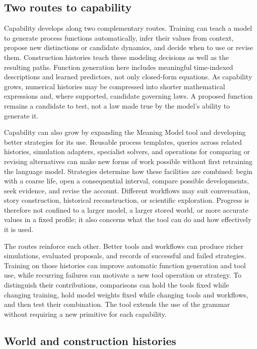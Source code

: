 \documentclass[10pt]{article}
\begin{document}
\subsection{Two routes to capability}

Capability develops along two complementary routes. Training can teach a
model to generate process functions automatically, infer their values from
context, propose new distinctions or candidate dynamics, and decide when to
use or revise them. Construction histories teach these modeling decisions as
well as the resulting paths. Function generation here includes meaningful
time-indexed descriptions and learned predictors, not only closed-form
equations. As capability grows, numerical histories may be compressed into
shorter mathematical expressions and, where supported, candidate governing
laws. A proposed function remains a candidate to test, not a law made
true by the model's ability to generate it.

Capability can also grow by expanding the Meaning Model tool and developing
better strategies for its use. Reusable process templates, queries across
related histories, simulation adapters, specialist solvers, and operations
for comparing or revising alternatives can make new forms of work possible
without first retraining the language model. Strategies determine how these
facilities are combined: begin with a coarse life, open a consequential
interval, compare possible developments, seek evidence, and revise the account.
Different workflows may suit conversation, story construction, historical
reconstruction, or scientific exploration. Progress is therefore not confined
to a larger model, a larger stored world, or more accurate values in a fixed
profile; it also concerns what the tool can do and how effectively it is used.

The routes reinforce each other. Better tools and workflows can produce
richer simulations, evaluated proposals, and records of successful and failed
strategies. Training on those histories can improve automatic function
generation and tool use, while recurring failures can motivate a new tool
operation or strategy. To distinguish their contributions, comparisons can
hold the tools fixed while changing training, hold model weights fixed while
changing tools and workflows, and then test their combination. The tool
extends the use of the grammar without requiring a new primitive for each
capability.

\subsection{World and construction histories}
\label{sec:construction-histories}
\end{document}
